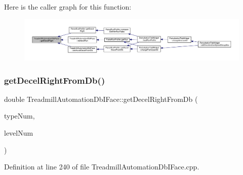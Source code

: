 Here is the caller graph for this function\+:
\nopagebreak
\begin{figure}[H]
\begin{center}
\leavevmode
\includegraphics[width=350pt]{class_treadmill_automation_db_i_face_afabbddb2f0fd390c6a3109d87d843a16_icgraph}
\end{center}
\end{figure}
\mbox{\label{class_treadmill_automation_db_i_face_af989096b53ecd094660db2a1b08edae9}} 
\subsubsection{\texorpdfstring{get\+Decel\+Right\+From\+Db()}{getDecelRightFromDb()}}
{\footnotesize\ttfamily double Treadmill\+Automation\+Db\+I\+Face\+::get\+Decel\+Right\+From\+Db (\begin{DoxyParamCaption}\item[{Q\+String}]{type\+Num,  }\item[{Q\+String}]{level\+Num }\end{DoxyParamCaption})}



Definition at line 240 of file Treadmill\+Automation\+Db\+I\+Face.\+cpp.

